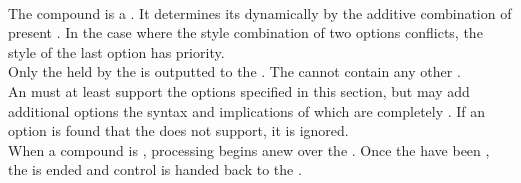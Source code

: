  \\

The compound  is a . It determines its  dynamically by the additive combination of present . In the case where the style combination of two options conflicts, the style of the last option has priority. \\

Only the  held by the  is outputted to the . The   cannot contain any other .\\

An  must at least support the options specified in this section, but may add additional options the syntax and implications of which are completely . If an option is found that the  does not support, it is ignored. \\

When a compound  is , processing begins anew over the . Once the  have been , the  is ended and control is handed back to the .











